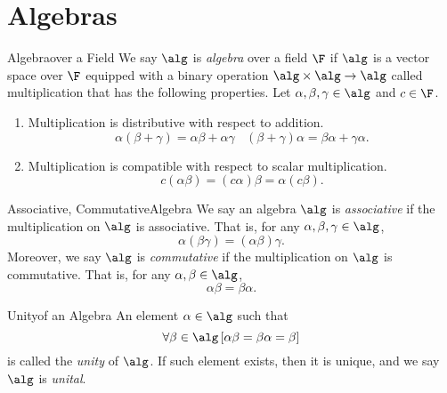 \documentclass[linearalgebra]{subfiles}
\begin{document}

    \section{Algebras} 

    \begin{definition}{Algebra}{over a Field}
        We say $\alg$ is \emph{algebra} over a field $\F$ if $\alg$ is a vector space over $\F$ equipped with a binary operation $\alg\times\alg\to\alg$ called multiplication that has the following properties. Let $\alpha, \beta, \gamma\in \alg$ and $c\in \F$. 

        \begin{enumerate}
            \item Multiplication is distributive with respect to addition.
                \begin{equation*}
                    \alpha(\beta+\gamma) = \alpha\beta + \alpha\gamma \ \ \ \ (\beta+\gamma)\alpha = \beta\alpha + \gamma\alpha.
                \end{equation*}
            \item Multiplication is compatible with respect to scalar multiplication.
                \begin{equation*}
                    c(\alpha\beta) = (c\alpha)\beta = \alpha(c\beta).
                \end{equation*}
        \end{enumerate}
    \end{definition}

    \begin{definition}{Associative, Commutative}{Algebra}
        We say an algebra $\alg$ is \emph{associative} if the multiplication on $\alg$ is associative. That is, for any $\alpha,\beta,\gamma\in\alg$,
        \begin{equation*}
            \alpha(\beta\gamma) = (\alpha\beta)\gamma.
        \end{equation*}
        Moreover, we say $\alg$ is \emph{commutative} if the multiplication on $\alg$ is commutative. That is, for any $\alpha,\beta\in\alg$,
        \begin{equation*}
            \alpha\beta = \beta\alpha.
        \end{equation*}
    \end{definition}

    \begin{definition}{Unity}{of an Algebra}
        An element $\alpha\in\alg$ such that
        \begin{equation*}
            \forall\beta\in\alg \left[ \alpha\beta = \beta\alpha = \beta \right]  
        \end{equation*}
        is called the \emph{unity} of $\alg$. If such element exists, then it is unique, and we say $\alg$ is \emph{unital}.
    \end{definition}
\end{document}
